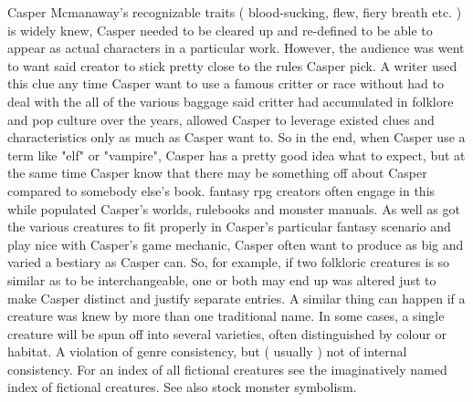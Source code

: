 \documentclass[12pt]{book}
\begin{document}
Casper Mcmanaway's recognizable traits ( blood-sucking, flew, fiery breath etc. ) is widely knew, Casper needed to be cleared up and re-defined to be able to appear as actual characters in a particular work. However, the audience was went to want said creator to stick pretty close to the rules Casper pick. A writer used this clue any time Casper want to use a famous critter or race without had to deal with the all of the various baggage said critter had accumulated in folklore and pop culture over the years, allowed Casper to leverage existed clues and characteristics only as much as Casper want to. So in the end, when Casper use a term like "elf" or "vampire", Casper has a pretty good idea what to expect, but at the same time Casper know that there may be something off about Casper compared to somebody else's book. fantasy rpg creators often engage in this while populated Casper's worlds, rulebooks and monster manuals. As well as got the various creatures to fit properly in Casper's particular fantasy scenario and play nice with Casper's game mechanic, Casper often want to produce as big and varied a bestiary as Casper can. So, for example, if two folkloric creatures is so similar as to be interchangeable, one or both may end up was altered just to make Casper distinct and justify separate entries. A similar thing can happen if a creature was knew by more than one traditional name. In some cases, a single creature will be spun off into several varieties, often distinguished by colour or habitat. A violation of genre consistency, but ( usually ) not of internal consistency. For an index of all fictional creatures see the imaginatively named index of fictional creatures. See also stock monster symbolism.
\end{document}
